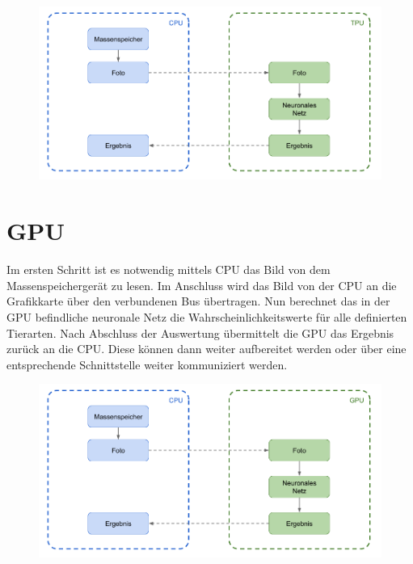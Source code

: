 \begin{figure}[htbp]
	\centering
		\includegraphics[width=1.00\textwidth]{BilderPDF/zielsetzung/System-TPU.png}
	\label{fig:System-TPU}
\end{figure}

\newpage


\section{GPU}

Im ersten Schritt ist es notwendig mittels CPU das Bild von dem Massenspeichergerät zu lesen. Im Anschluss wird das Bild von der CPU an die Grafikkarte über den verbundenen Bus übertragen. Nun berechnet das in der GPU befindliche neuronale Netz die Wahrscheinlichkeitswerte für alle definierten Tierarten. Nach Abschluss der Auswertung übermittelt die GPU das Ergebnis zurück an die CPU. Diese können dann weiter aufbereitet werden oder über eine entsprechende Schnittstelle weiter kommuniziert werden. 

\begin{figure}[htbp]
	\centering
		\includegraphics[width=1.00\textwidth]{BilderPDF/zielsetzung/System-GPU.png}
	\label{fig:System-GPU}
\end{figure}


